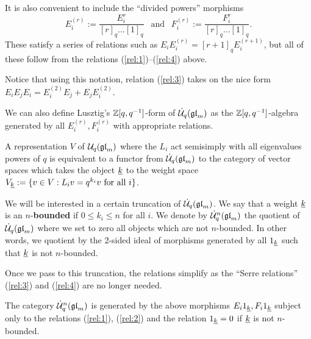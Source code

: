 \documentclass[10pt,leqno]{article}
\begin{document}
It is also convenient to include the ``divided powers'' morphisms
$$E_i^{(r)} := \frac{E_i^r}{[r]_q \dots [1]_q} \ \ \text{ and } \ \ F_i^{(r)} := \frac{F_i^r}{[r]_q \dots [1]_q}.$$
These satisfy a series of relations such as
$ E_i E_i^{(r)} = [r+1]_q E_i^{(r+1)}$, but all of these follow from the relations (\ref{rel:1})--(\ref{rel:4}) above.

Notice that using this notation, relation (\ref{rel:3}) takes on the nice form $E_iE_jE_i = E_i^{(2)}E_j + E_jE_i^{(2)}$.

\begin{rem}
We can also define Lusztig's ${\mathbb{Z}}[q, q^{-1}] $-form of $ \dot{{\mathcal{U}}}_q({\mathfrak{gl}}_m) $ as the $ {\mathbb{Z}}[q,q^{-1}]$-algebra generated by all $ E_i^{(r)}, F_i^{(r)} $ with appropriate relations.
\end{rem}

A representation $ V $ of $ \mathcal{U}_q({\mathfrak{gl}}_m) $ where the $ L_i $ act semisimply with all eigenvalues powers of $ q $ is equivalent to a functor from $ \dot{{\mathcal{U}}}_q({\mathfrak{gl}}_m) $ to the category of vector spaces which takes the object $ {\underline{k}} $ to the weight space $ V_{{\underline{k}}} := \{ v \in V : L_i v = q^{k_i} v \text{ for all } i \} $. 

We will be interested in a certain truncation of $ \dot{{\mathcal{U}}}_q({\mathfrak{gl}}_m) $.  We say that a weight $ {\underline{k}} $ is an $n$-\textbf{bounded} if $ 0 \le k_i \le n $ for all $ i$.  We denote by $\dot{{\mathcal{U}}}_q^n({\mathfrak{gl}}_m)$ the quotient of $\dot{{\mathcal{U}}}_q({\mathfrak{gl}}_m)$ where we set to zero all objects which are not $n$-bounded. In other words, we quotient by the 2-sided ideal of morphisms generated by all $ 1_{{\underline{k}}} $ such that $ {\underline{k}} $ is not $ n$-bounded.

Once we pass to this truncation, the relations simplify as the ``Serre relations'' (\ref{rel:3}) and (\ref{rel:4}) are no longer needed.

\begin{prop} \label{th:quotientrelations}
The category $ \dot{{\mathcal{U}}}_q^n({\mathfrak{gl}}_m) $ is generated by the above morphisms $ E_i 1_{{\underline{k}}}, F_i 1_{{\underline{k}}} $ subject only to the relations (\ref{rel:1}), (\ref{rel:2}) and the relation $ 1_{{\underline{k}}} = 0 $ if $ {\underline{k}} $ is not $ n$-bounded.
\end{prop}

\end{document}
